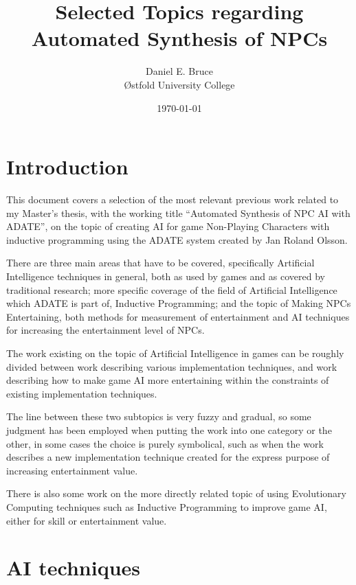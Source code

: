 \documentclass[]{report}
\begin{document}
\title{Selected Topics regarding Automated Synthesis of NPCs}
\author{Daniel E. Bruce\\ \O{}stfold University College}
\date{\today}
\maketitle

\tableofcontents


\chapter{Introduction}
\label{cha:introduction}

This document covers a selection of the most relevant previous work related to
my Master's thesis, with the working title ``Automated Synthesis of NPC AI with
ADATE'', on the topic of creating AI for game Non-Playing Characters with
inductive programming using the ADATE system created by Jan Roland Olsson.

There are three main areas that have to be covered, specifically Artificial
Intelligence techniques in general, both as used by games and as covered by
traditional research; more specific coverage of the field of Artificial
Intelligence which ADATE is part of, Inductive Programming; and the topic of
Making NPCs Entertaining, both methods for measurement of entertainment and AI
techniques for increasing the entertainment level of NPCs.

The work existing on the topic of Artificial Intelligence in games can be
roughly divided between work describing various implementation techniques, and
work describing how to make game AI more entertaining within the constraints of
existing implementation techniques.

The line between these two subtopics is very fuzzy and gradual, so some judgment
has been employed when putting the work into one category or the other, in some
cases the choice is purely symbolical, such as when the work describes a new
implementation technique created for the express purpose of increasing
entertainment value.

There is also some work on the more directly related topic of using Evolutionary
Computing techniques such as Inductive Programming to improve game AI, either
for skill or entertainment value.

\chapter{AI techniques}
\label{cha:ai-techniques}
\end{document}
